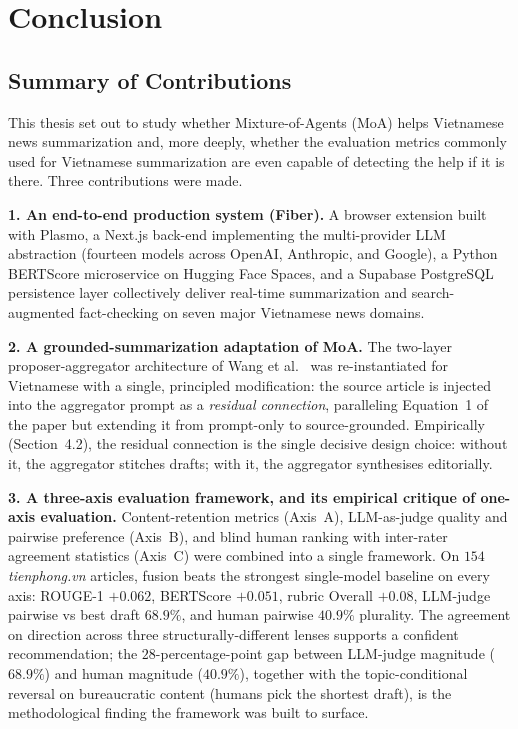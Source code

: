\chapter{Conclusion}
\label{ch:conclusion}

\section{Summary of Contributions}

This thesis set out to study whether Mixture-of-Agents (MoA) helps
Vietnamese news summarization and, more deeply, whether the
evaluation metrics commonly used for Vietnamese summarization are
even capable of detecting the help if it is there. Three contributions
were made.

\textbf{1. An end-to-end production system (Fiber).} A browser
extension built with Plasmo, a Next.js back-end implementing the
multi-provider LLM abstraction (fourteen models across OpenAI,
Anthropic, and Google), a Python BERTScore microservice on Hugging
Face Spaces, and a Supabase PostgreSQL persistence layer
collectively deliver real-time summarization
and search-augmented fact-checking on seven major Vietnamese news
domains.

\textbf{2. A grounded-summarization adaptation of MoA.} The two-layer
proposer-aggregator architecture of Wang et al.\ \cite{Wang2024} was
re-instantiated for Vietnamese with a single, principled
modification: the source article is injected into the aggregator
prompt as a \textit{residual connection}, paralleling Equation~1 of
the paper but extending it from prompt-only to source-grounded.
Empirically (Section~4.2), the residual connection is the single
decisive design choice: without it, the aggregator stitches drafts;
with it, the aggregator synthesises editorially.

\textbf{3. A three-axis evaluation framework, and its empirical
critique of one-axis evaluation.} Content-retention metrics (Axis~A),
LLM-as-judge quality and pairwise preference (Axis~B), and blind
human ranking with inter-rater agreement statistics (Axis~C) were
combined into a single framework. On $154$ \textit{tienphong.vn}
articles, fusion beats the strongest single-model baseline on every axis: ROUGE-1
$+0.062$, BERTScore $+0.051$, rubric Overall $+0.08$, LLM-judge
pairwise vs best draft $68.9\%$, and human pairwise $40.9\%$ plurality.
The agreement on direction across three structurally-different
lenses supports a confident recommendation; the
$28$-percentage-point gap between LLM-judge magnitude ($68.9\%$) and
human magnitude ($40.9\%$), together with the topic-conditional
reversal on bureaucratic content (humans pick the shortest draft),
is the methodological finding the framework was built to surface.

